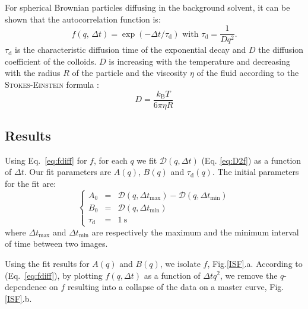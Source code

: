 \documentclass[%
 aip,
 jmp,%
 amsmath,amssymb,
reprint,%
]{revtex4-1}
\begin{document}
 For  spherical Brownian  particles  diffusing  in  the  background  solvent,  it can be shown that the autocorrelation function is\cite{18_sartor2003dynamic, ajp1999goldburg,ajp1969clark,8_berne2000dynamic}:
\begin{equation}
f(q, \, \Delta t) = \exp(-\Delta t/\tau_\text{d})\text{ with }\tau_\text{d} = \frac{1}{Dq^2}.
\label{eq:fdiff}
\end{equation}
$\tau_\text{d}$ is the characteristic diffusion time of the exponential decay and $D$ the diffusion coefficient of the colloids. $D$ is increasing with the temperature and decreasing with the radius $R$ of the particle and the viscosity $\eta$ of the fluid according to the \textsc{Stokes-Einstein} formula \cite{Nelson2014, 16_CollSusp, ajp1997lemons, ajp2007jia}:
\begin{equation}
D = \frac{k_\text{B} T}{6 \pi \eta R}
\end{equation}

\subsection{Results}
\label{resultcolloid}

Using Eq.~\eqref{eq:fdiff} for $f$, for each $q$ we fit $\mathcal{D}(q, \Delta t)$ (Eq. \eqref{eq:D2f}) as a function of $\Delta t$. Our fit parameters are $A(q)$, $B(q)$ and $\tau_\text{d}(q)$. The initial parameters for the fit are:
\begin{equation}
\left\{
\begin{array}{rcl}
A_0 &=& \mathcal{D} (q,\Delta t_\text{max}) - \mathcal{D} (q,\Delta t_\text{min}) \\
B_0 &=& \mathcal{D} (q,\Delta t_\text{min}) \\
\tau_\text{d} &=& \SI{1}{\second}
\end{array}
\right.
\end{equation}
where $\Delta t_\text{max}$ and $\Delta t_\text{min}$ are respectively the maximum and the minimum interval of time between two images.

Using the fit results for $A(q)$ and $B(q)$, we isolate $f$, Fig.\ref{ISF}.a. According to (Eq.~\ref{eq:fdiff}), by plotting $f(q, \Delta t)$ as a function of $\Delta t q^2$, we remove the $q$-dependence on $f$ resulting into a collapse of the data on a master curve, Fig.\ref{ISF}.b. 
\end{document}
